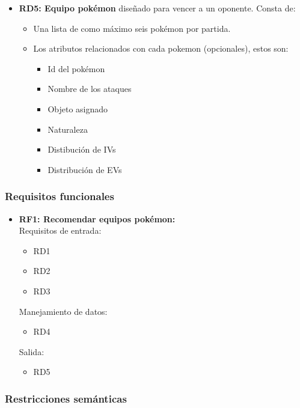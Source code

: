 \begin{itemize}
		\item \textbf{RD5: Equipo pokémon} diseñado para vencer a un oponente.
			Consta de:
			\begin{itemize}
				\item Una lista de como máximo seis pokémon por partida.
				\item Los atributos relacionados con cada pokemon
					(opcionales), estos son:
					\begin{itemize}
						\item Id del pokémon
						\item Nombre de los ataques
						\item Objeto asignado
						\item Naturaleza
						\item Distibución de IVs
						\item Distribución de EVs
					\end{itemize}
			\end{itemize}
	\end{itemize}


\subsubsection{Requisitos funcionales}

	\begin{itemize}
		\item \textbf{RF1: Recomendar equipos pokémon:}\\

		Requisitos de entrada:
		\begin{itemize}
			\item RD1 %
			\item RD2 %
			\item RD3 %
		\end{itemize}

		Manejamiento de datos:
		\begin{itemize}
			\item RD4 %
		\end{itemize}

		Salida:
		\begin{itemize}
			\item RD5 %
		\end{itemize}
	\end{itemize}


\subsubsection{Restricciones semánticas}
